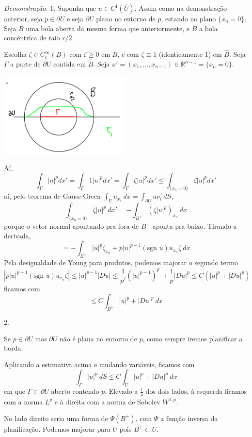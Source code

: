 \documentclass[11pt]{article}
\newcommand{\R}{\mathbb{R}}
\newcommand{\pu}{\partial U}
\begin{document}
\textit{Demonstração.} 1. Suponha que $u \in C^1(\overline{U})$. Assim como na demonstração anterior, seja $p \in \pu$ e seja $\pu$ plano no entorno de $p$, estando no plano $\{x_n=0\}$. Seja $B$ uma bola aberta da mesma forma que anteriormente, e $\hat{B}$ a bola concêntrica de raio $r/2$.

Escolha $\zeta \in C^\infty_c(B)$ com $\zeta\geq0$ em $B$, e com $\zeta\equiv1$ (identicamente 1) em $\hat{B}$. Seja $\Gamma$ a parte de $\pu$ contida em $\hat{B}$. Seja $x'=(x_1, \ldots, x_{n-1}) \in \R^{n-1}= \{x_n=0\}$.

\begin{center}
	\includegraphics[width=0.5\textwidth]{Imagens/Sobolev-5}
\end{center}

Aí, \[
	\int_\Gamma |u|^p dx' = \int_\Gamma 1|u|^p dx' = \int_\Gamma \zeta |u|^p dx' \leq \int_{\{x_n=0\}} \zeta |u|^p dx'
\] aí, pelo teorema de Gauss-Green $ \int_U u_{x_i}\ dx = \int_{\partial U} u \vec{\nu_i}\ dS $, \[ \int_{\{x_n=0\}} \zeta |u|^p\ dx' = -\int_{B^+} \left(\zeta |u|^p \right)_{x_n}\ dx \] porque o vetor normal apontando pra fora de $B^+$ aponta pra baixo. Tirando a derivada, \[ = -\int_{B^+} |u|^p \zeta_{x_n} + p |u|^{p-1} (\text{sgn } u) u_{x_n} \zeta\ dx \]
Pela desigualdade de Young para produtos, podemos majorar o segundo termo \[ \left| p  |u|^{p-1} (\text{sgn } u ) u_{x_n} \zeta \right| \leq |u|^{p-1} |Du| \leq \frac{1}{p'}(|u|^{p-1})^{p'} + \frac{1}{p}|Du|^p \leq C\left( |u|^p + |Du|^p\right)\] ficamos com \[ \leq C \int_{B^+} |u|^p + |Du|^p\ dx \]

2.

Se $p \in \pu$ mas $\pu$ não é plana no entorno de $p$, como sempre iremos planificar a borda.

Aplicando a estimativa acima e mudando variáveis, ficamos com \[ \int_\Gamma |u|^p\ dS \leq C \int_U |u|^p + |Du|^p\ dx \] em que $\Gamma \subset \pu$ aberto contendo $p$. Elevado a $ \frac{1}{p} $ dos dois lados, à esquerda ficamos com a norma $ L^p $ e à direita com a norma de Sobolev $ W^{1,p} $.

No lado direito seria uma forma de $\Psi(B^+)$, com $\Psi$ a função inversa da planificação. Podemos majorar para $U$ pois $B^+ \subset U$.
\end{document}
